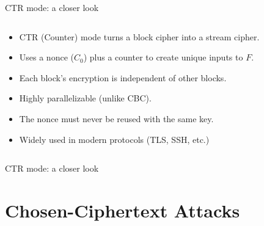 \documentclass[aspectratio=169, lualatex, handout]{beamer}
\begin{document}
\begin{frame}{CTR mode: a closer look}
	\begin{columns}[c]
		\begin{column}{0.6\textwidth}
			\begin{itemize}[<+->]
				\item CTR (Counter) mode turns a block cipher into a stream cipher.
				\item Uses a nonce ($C_0$) plus a counter to create unique inputs to $F$.
				\item Each block's encryption is independent of other blocks.
				\item Highly parallelizable (unlike CBC).
				\item The nonce must never be reused with the same key.
				\item Widely used in modern protocols (TLS, SSH, etc.)
			\end{itemize}
		\end{column}
		\begin{column}{0.4\textwidth}
		\end{column}
	\end{columns}
\end{frame}

\begin{frame}{CTR mode: a closer look}
\end{frame}

\section{Chosen-Ciphertext Attacks}
\end{document}
